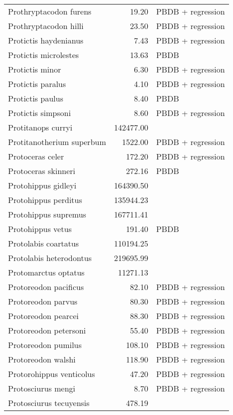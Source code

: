 \begin{table}[ht]
\begin{tabular}{lrl}
  Prothryptacodon furens & 19.20 & PBDB + regression \\ 
  Prothryptacodon hilli & 23.50 & PBDB + regression \\ 
  Protictis haydenianus & 7.43 & PBDB + regression \\ 
  Protictis microlestes & 13.63 & PBDB \\ 
  Protictis minor & 6.30 & PBDB + regression \\ 
  Protictis paralus & 4.10 & PBDB + regression \\ 
  Protictis paulus & 8.40 & PBDB \\ 
  Protictis simpsoni & 8.60 & PBDB + regression \\ 
  Protitanops curryi & 142477.00 & \cite{McKenna2011} \\ 
  Protitanotherium superbum & 1522.00 & PBDB + regression \\ 
  Protoceras celer & 172.20 & PBDB + regression \\ 
  Protoceras skinneri & 272.16 & PBDB \\ 
  Protohippus gidleyi & 164390.50 & \cite{Tomiya2013} \\ 
  Protohippus perditus & 135944.23 & \cite{Tomiya2013} \\ 
  Protohippus supremus & 167711.41 & \cite{Tomiya2013} \\ 
  Protohippus vetus & 191.40 & PBDB \\ 
  Protolabis coartatus & 110194.25 & \cite{Tomiya2013} \\ 
  Protolabis heterodontus & 219695.99 & \cite{Tomiya2013} \\ 
  Protomarctus optatus & 11271.13 & \cite{Tomiya2013} \\ 
  Protoreodon pacificus & 82.10 & PBDB + regression \\ 
  Protoreodon parvus & 80.30 & PBDB + regression \\ 
  Protoreodon pearcei & 88.30 & PBDB + regression \\ 
  Protoreodon petersoni & 55.40 & PBDB + regression \\ 
  Protoreodon pumilus & 108.10 & PBDB + regression \\ 
  Protoreodon walshi & 118.90 & PBDB + regression \\ 
  Protorohippus venticolus & 47.20 & PBDB + regression \\ 
  Protosciurus mengi & 8.70 & PBDB + regression \\ 
  Protosciurus tecuyensis & 478.19 & \cite{Tomiya2013} \\ 

\end{tabular}
\end{table}
